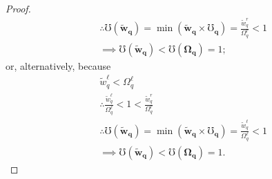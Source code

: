 \documentclass[hidelinks, nonatbib]{elsarticle}
\begin{document}
\begin{lemma}
\begin{proof}
\begin{align}
            &\therefore
            \mho(\boldsymbol{\tilde{w}_q})
            = 
            \min(
                \boldsymbol{\tilde{w}_q}
                \times
                \boldsymbol{\mho_q}
            )
            =
            \frac{
                \tilde{w}_{q}^{r}
            }{
                \Omega_{q}^{r}
            }
            < 
            1
            \\
            &\implies
            \mho(\boldsymbol{\tilde{w}_q})
            <
            \mho(\boldsymbol{\Omega_q})
            =
            1
            ;
        \end{align}
        or, alternatively, because
        \begin{align}
            &
            \tilde{w}_{q}^{\ell} < \Omega_{q}^{\ell}
            \\
            &\therefore
            \frac{
                \tilde{w}_{q}^{\ell}
            }{
                \Omega_{q}^{\ell}
            }
            < 
            1
            < 
            \frac{
                \tilde{w}_{q}^{r}
            }{
                \Omega_{q}^{r}
            }
            \\
            &\therefore
            \mho(\boldsymbol{\tilde{w}_q})
            = 
            \min(
                \boldsymbol{\tilde{w}_q}
                \times
                \boldsymbol{\mho_q}
            )
            =
            \frac{
                \tilde{w}_{q}^{\ell}
            }{
                \Omega_{q}^{\ell}
            }
            < 
            1
            \\
            &\implies
            \mho(\boldsymbol{\tilde{w}_q})
            <
            \mho(\boldsymbol{\Omega_q})
            =
            1
            .
        \end{align}
        

\end{proof}
\end{lemma}
\end{document}
